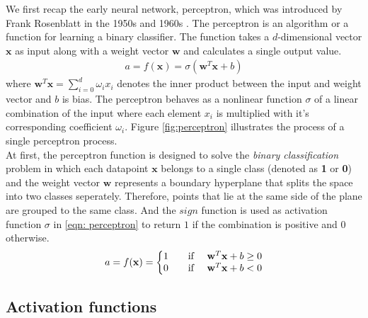 We first recap the early neural network, perceptron, which was introduced by Frank Rosenblatt in the 1950s \cite{rosenblatt1958perceptron} and 1960s \cite{rosenblatt1961principles}. 
The perceptron is an algorithm or a function for learning a binary classifier.
The function takes a $d$-dimensional vector $\mathbf{x}$ as input along with a weight vector $\mathbf{w}$ and calculates a single output value. 
\begin{align} \label{eqn: perceptron}
    a = f(\mathbf{x}) = \sigma(\mathbf{w}^T\mathbf{x} + b)
\end{align}
where $\mathbf{w}^T\mathbf{x} = \sum_{i=0}^{d} \omega_{i}x_{i} $ denotes the inner product between the input and weight vector and $b$ is bias. The perceptron behaves as a nonlinear function $\sigma$ of a linear combination of the input where each element $x_{i}$ is multiplied with it's corresponding coefficient $\omega_{i}$. 
Figure \ref{fig:perceptron} illustrates the process of a single perceptron process.\\
At first, the perceptron function is designed to solve the \textit{binary classification} problem in which each datapoint $\mathbf{x}$ belongs to a single class (denoted as \textbf{1} or \textbf{0}) and the weight vector $\mathbf{w}$ represents a boundary hyperplane that splits the space into two classes seperately. 
Therefore, points that lie at the same side of the plane are grouped to the same class. 
And the $sign$ function is used as activation function $\sigma$ in \ref{eqn: perceptron} to return $1$ if the combination is positive and $0$ otherwise.
\begin{align} \label{eqn: sgn_perceptron}
    a = f(\mathbf{x}) = \left\{\begin{matrix}
1 & \text{\quad if \quad} \mathbf{w}^T\mathbf{x} + b\geq 0 \\ 
0 & \text{\quad if \quad} \mathbf{w}^T\mathbf{x} + b <  0 
\end{matrix}\right.
\end{align}

\subsection{Activation functions}

